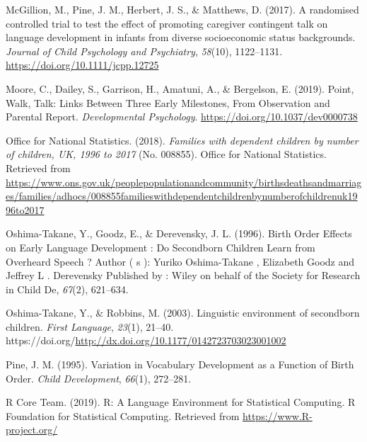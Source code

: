 \documentclass[
  man,floatsintext]{apa6}
\newlength{\cslhangindent}
\newlength{\cslentryspacingunit} %
\newenvironment{CSLReferences}[2] %
 {%
  \setlength{\parindent}{0pt}
  \ifodd #1
  \let\oldpar\par
  \def\par{\hangindent=\cslhangindent\oldpar}
  \fi
  \setlength{\parskip}{#2\cslentryspacingunit}
 }%
 {}
\begin{document}
\begin{CSLReferences}{1}{0}
\leavevmode{}%
McGillion, M., Pine, J. M., Herbert, J. S., \& Matthews, D. (2017). A randomised controlled trial to test the effect of promoting caregiver contingent talk on language development in infants from diverse socioeconomic status backgrounds. \emph{Journal of Child Psychology and Psychiatry}, \emph{58}(10), 1122--1131. \url{https://doi.org/10.1111/jcpp.12725}

\leavevmode{}%
Moore, C., Dailey, S., Garrison, H., Amatuni, A., \& Bergelson, E. (2019). Point, {Walk}, {Talk}: {Links} {Between} {Three} {Early} {Milestones}, {From} {Observation} and {Parental} {Report}. \emph{Developmental Psychology}. \url{https://doi.org/10.1037/dev0000738}

\leavevmode{}%
Office for National Statistics. (2018). \emph{Families with dependent children by number of children, {UK}, 1996 to 2017} (No. 008855). Office for National Statistics. Retrieved from \url{https://www.ons.gov.uk/peoplepopulationandcommunity/birthsdeathsandmarriages/families/adhocs/008855familieswithdependentchildrenbynumberofchildrenuk1996to2017}

\leavevmode{}%
Oshima-Takane, Y., Goodz, E., \& Derevensky, J. L. (1996). Birth {Order} {Effects} on {Early} {Language} {Development} : {Do} {Secondborn} {Children} {Learn} from {Overheard} {Speech} ? {Author} ( s ): {Yuriko} {Oshima}-{Takane} , {Elizabeth} {Goodz} and {Jeffrey} {L} . {Derevensky} {Published} by : {Wiley} on behalf of the {Society} for {Research} in {Child} {De}, \emph{67}(2), 621--634.

\leavevmode{}%
Oshima-Takane, Y., \& Robbins, M. (2003). Linguistic environment of secondborn children. \emph{First Language}, \emph{23}(1), 21--40. https://doi.org/\url{http://dx.doi.org/10.1177/0142723703023001002}

\leavevmode{}%
Pine, J. M. (1995). Variation in {Vocabulary} {Development} as a {Function} of {Birth} {Order}. \emph{Child Development}, \emph{66}(1), 272--281.

\leavevmode{}%
R Core Team. (2019). R: {A} {Language} {Environment} for {Statistical} {Computing}. R Foundation for Statistical Computing. Retrieved from \url{https://www.R-project.org/}


\end{CSLReferences}
\end{document}
